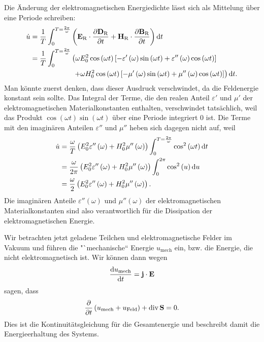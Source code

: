 Die Änderung der elektromagnetischen Energiedichte lässt sich als Mittelung über eine Periode schreiben:
\begin{align*}
	\dot{u} & =\frac{1}{T}\int _{0}^{T=\frac{2\pi }{\omega }}\left(\mathbf{E}_{\mathrm{R}}\cdot \frac{\partial \mathbf{D}_{\mathrm{R}}}{\partial t}+\mathbf{H}_{\mathrm{R}}\cdot \frac{\partial \mathbf{B}_{\mathrm{R}}}{\partial t}\right)\mathop{}\!\mathrm{d} t                  \\
	        & =\frac{1}{T}\int _{0}^{T=\frac{2\pi }{\omega }}\left(\omega E_{0}^{2}\cos \left(\omega t\right)\left[-\varepsilon '\left(\omega \right)\sin \left(\omega t\right)+\varepsilon ''\left(\omega \right)\cos \left(\omega t\right)\right] \right. \\
	        & \qquad\qquad\qquad \left. +\omega H_{0}^{2}\cos \left(\omega t\right)\left[-\mu '\left(\omega \right)\sin \left(\omega t\right)+\mu ''\left(\omega \right)\cos \left(\omega t\right)\right]\right)\mathop{}\!\mathrm{d} t.
\end{align*}
Man könnte zuerst denken, dass dieser Ausdruck verschwindet, da die Feldenergie konstant sein sollte. Das Integral der Terme, die den realen Anteil $\varepsilon '$ und $\mu '$ der elektromagnetischen Materialkonstanten enthalten, verschwindet tatsächlich, weil das Produkt $\cos \left(\omega t\right)\sin \left(\omega t\right)$ über eine Periode integriert $0$ ist. Die Terme mit den imaginären Anteilen $\varepsilon ''$ und $\mu ''$ heben sich dagegen nicht auf, weil
\begin{align*}
	\dot{u} & =\frac{\omega }{T}\left(E_{0}^{2}\varepsilon ''\left(\omega \right)+H_{0}^{2}\mu ''\left(\omega \right)\right)\int _{0}^{T=\frac{2\pi }{\omega }}\cos ^{2} \left(\omega t\right)\mathop{}\!\mathrm{d} t \\
	        & =\frac{\omega }{2\pi }\left(E_{0}^{2}\varepsilon ''\left(\omega \right)+H_{0}^{2}\mu ''\left(\omega \right)\right)\int _{0}^{2\pi }\cos ^{2} \left(u\right)\mathop{}\!\mathrm{d} u                      \\
	        & =\frac{\omega }{2}\left(E_{0}^{2}\varepsilon ''\left(\omega \right)+H_{0}^{2}\mu ''\left(\omega \right)\right).
\end{align*}
Die imaginären Anteile $\varepsilon ''\left(\omega \right)$ und $\mu ''\left(\omega \right)$ der elektromagnetischen Materialkonstanten sind also verantwortlich für die Dissipation der elektromagnetischen Energie.

Wir betrachten jetzt geladene Teilchen und elektromagnetische Felder im Vakuum und führen die "`mechanische`` Energie $u_{\mathrm{mech}}$ ein, bzw. die Energie, die nicht elektromagnetisch ist. Wir können dann wegen
\begin{equation*}
	\frac{\mathop{}\!\mathrm{d} u_{\mathrm{mech}}}{\mathop{}\!\mathrm{d} t}=\mathbf{j}\cdot \mathbf{E}
\end{equation*}
sagen, dass
\begin{equation*}
	\frac{\partial }{\partial t}\left(u_{\mathrm{mech}}+u_{\text{Feld}}\right)+\operatorname{div} \mathbf{S}=0.
\end{equation*}
Dies ist die Kontinuitätsgleichung für die Gesamtenergie und beschreibt damit die Energieerhaltung des Systems.

